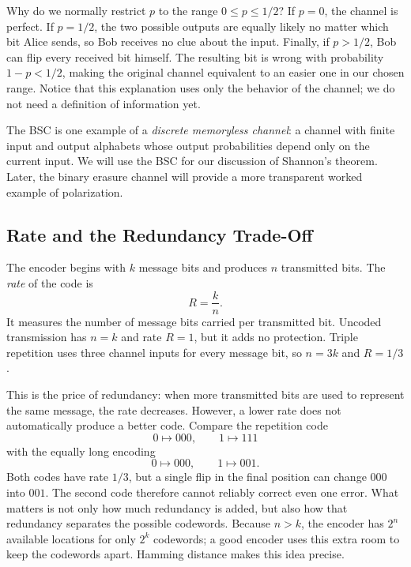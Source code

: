 \newpage

Why do we normally restrict $p$ to the range $0\leq p\leq 1/2$? If $p=0$, the channel is perfect. If $p=1/2$, the two possible outputs are equally likely no matter which bit Alice sends, so Bob receives no clue about the input. Finally, if $p>1/2$, Bob can flip every received bit himself. The resulting bit is wrong with probability $1-p<1/2$, making the original channel equivalent to an easier one in our chosen range. Notice that this explanation uses only the behavior of the channel; we do not need a definition of information yet.

The BSC is one example of a \emph{discrete memoryless channel}: a channel with finite input and output alphabets whose output probabilities depend only on the current input. We will use the BSC for our discussion of Shannon's theorem. Later, the binary erasure channel will provide a more transparent worked example of polarization.

\subsection{Rate and the Redundancy Trade-Off}

The encoder begins with $k$ message bits and produces $n$ transmitted bits. The \emph{rate} of the code is
\begin{equation}
R=\frac{k}{n}.
\label{eq:code-rate}
\end{equation}
It measures the number of message bits carried per transmitted bit. Uncoded transmission has $n=k$ and rate $R=1$, but it adds no protection. Triple repetition uses three channel inputs for every message bit, so $n=3k$ and $R=1/3$.

This is the price of redundancy: when more transmitted bits are used to represent the same message, the rate decreases. However, a lower rate does not automatically produce a better code. Compare the repetition code
\[
0\longmapsto000,
\qquad
1\longmapsto111
\]
with the equally long encoding
\[
0\longmapsto000,
\qquad
1\longmapsto001.
\]
Both codes have rate $1/3$, but a single flip in the final position can change $000$ into $001$. The second code therefore cannot reliably correct even one error. What matters is not only how much redundancy is added, but also how that redundancy separates the possible codewords. Because $n>k$, the encoder has $2^n$ available locations for only $2^k$ codewords; a good encoder uses this extra room to keep the codewords apart. Hamming distance makes this idea precise.

